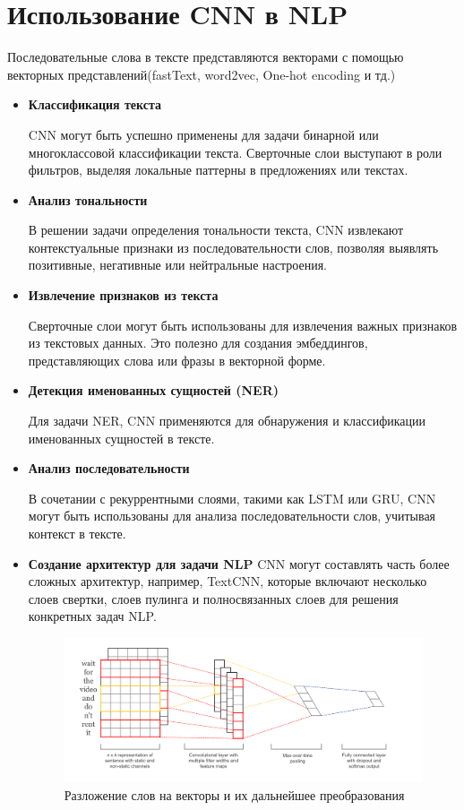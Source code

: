 \documentclass{article}
\theoremstyle{definition}
\theoremstyle{theorem}
\theoremstyle{remark}
\theoremstyle{theorem}
\theoremstyle{example}
\theoremstyle{theorem}
\theoremstyle{theorem}
\theoremstyle{theorem}
\theoremstyle{theorem}
\begin{document}
	\section{Использование CNN в NLP}
	Последовательные слова в тексте представляются векторами с
	помощью векторных представлений(fastText, word2vec, One-hot
	encoding и тд.)
	\begin{itemize}

	\item \textbf{Классификация текста}
	
	CNN могут быть успешно применены для задачи бинарной или многоклассовой классификации текста. Сверточные слои выступают в роли фильтров, выделяя локальные паттерны в предложениях или текстах.
	
	\item \textbf{Анализ тональности}
	
	В решении задачи определения тональности текста, CNN извлекают контекстуальные признаки из последовательности слов, позволяя выявлять позитивные, негативные или нейтральные настроения.
	
	\item \textbf{Извлечение признаков из текста}
	
	Сверточные слои могут быть использованы для извлечения важных признаков из текстовых данных. Это полезно для создания эмбеддингов, представляющих слова или фразы в векторной форме.
	
	\item \textbf{Детекция именованных сущностей (NER)}
	
	Для задачи NER, CNN применяются для обнаружения и классификации именованных сущностей в тексте.
	
	\item \textbf{Анализ последовательности}
	
	В сочетании с рекуррентными слоями, такими как LSTM или GRU, CNN могут быть использованы для анализа последовательности слов, учитывая контекст в тексте.
	
	\item \textbf{Создание архитектур для задачи NLP}
	CNN могут составлять часть более сложных архитектур, например, TextCNN, которые включают несколько слоев свертки, слоев пулинга и полносвязанных слоев для решения конкретных задач NLP.
	\begin{figure}[h!]
		\includegraphics[width=\textwidth]{nlp.png}\caption{Разложение слов на векторы и их дальнейшее преобразования}
	\end{figure}
	\end{itemize}
\end{document}
